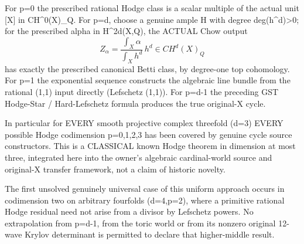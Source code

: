\documentclass[11pt]{article}
\begin{document}
For p=0 the prescribed rational Hodge
class is a scalar multiple of the
actual unit [X] in CH^0(X)_Q.
For p=d, choose a genuine ample H with
degree deg(h^d)>0; for the prescribed
alpha in H^{2d}(X,Q), the ACTUAL Chow
output
\[
Z_\alpha=
\frac{\int_X\alpha}{\int_X h^d}\,h^d
\in CH^d(X)_Q
\]
has exactly the prescribed canonical
Betti class, by degree-one top
cohomology. For p=1 the exponential
sequence constructs the algebraic
line bundle from the rational (1,1)
input directly (Lefschetz (1,1)).
For p=d-1 the preceding GST
Hodge-Star / Hard-Lefschetz formula
produces the true original-X cycle.

In particular for EVERY smooth projective
complex threefold (d=3) EVERY possible
Hodge codimension p=0,1,2,3
has been covered by genuine cycle
source constructors. This is a
CLASSICAL known Hodge theorem in
dimension at most three, integrated
here into the owner's algebraic
cardinal-world source and original-X
transfer framework, not a claim of
historic novelty.

The first unsolved genuinely universal
case of this uniform approach occurs
in codimension two on arbitrary
fourfolds (d=4,p=2), where a primitive
rational Hodge residual need not arise
from a divisor by Lefschetz powers.
No extrapolation from p=d-1,
from the toric world or from its
nonzero original 12-wave Krylov
determinant is permitted to
declare that higher-middle result.
\end{document}
